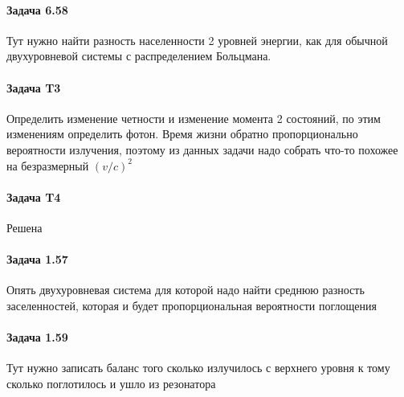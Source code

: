 \documentclass[12pt]{article}
\begin{document}
\paragraph{Задача 6.58} Тут нужно найти разность населенности 2 уровней энергии, как для обычной двухуровневой системы с распределением Больцмана.
\paragraph{Задача T3} Определить изменение четности и изменение момента 2 состояний, по этим изменениям определить фотон. Время жизни обратно пропорционально вероятности излучения, поэтому из данных задачи надо собрать что-то похожее на безразмерный $(v/c)^2$ 
\paragraph{Задача T4} Решена
\paragraph{Задача 1.57} Опять двухуровневая система для которой надо найти среднюю разность заселенностей, которая и будет пропорциональная вероятности поглощения
\paragraph{Задача 1.59} Тут нужно записать баланс того сколько излучилось с верхнего уровня к тому сколько поглотилось и ушло из резонатора
\end{document}
